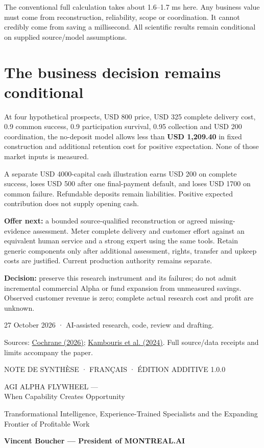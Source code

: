 \documentclass[10pt]{article}
\begin{document}
The conventional full calculation takes about 1.6–1.7 ms here. Any business value must come from reconstruction, reliability, scope or coordination. It cannot credibly come from saving a millisecond. All scientific results remain conditional on supplied source/model assumptions.

\section*{The business decision remains conditional}

At four hypothetical prospects, USD 800 price, USD 325 complete delivery cost, 0.9 common success, 0.9 participation survival, 0.95 collection and USD 200 coordination, the no-deposit model allows less than \textbf{USD 1,209.40} in fixed construction and additional retention cost for positive expectation. None of those market inputs is measured.

A separate USD 4000-capital cash illustration earns USD 200 on complete success, loses USD 500 after one final-payment default, and loses USD 1700 on common failure. Refundable deposits remain liabilities. Positive expected contribution does not supply opening cash.

\textbf{Offer next:} a bounded source-qualified reconstruction or agreed missing-evidence assessment. Meter complete delivery and customer effort against an equivalent human service and a strong expert using the same tools. Retain generic components only after additional assessment, rights, transfer and upkeep costs are justified. Current production authority remains separate.

\textbf{Decision:} preserve this research instrument and its failures; do not admit incremental commercial Alpha or fund expansion from unmeasured savings. Observed customer revenue is zero; complete actual research cost and profit are unknown.

\vfill
{\footnotesize\color{teal}27 October 2026 · AI-assisted research, code, review and drafting.\par
Sources: \href{https://www.cochrane.org/about-us/news/cochrane-strengthens-systems-manage-retracted-publications-its-published-reviews}{Cochrane (2026)}; \href{https://journals.plos.org/plosone/article?id=10.1371/journal.pone.0300333}{Kambouris et al. (2024)}. Full source/data receipts and limits accompany the paper.}

\newpage
\thispagestyle{empty}
{\sffamily\small\color{teal}NOTE DE SYNTHÈSE · FRANÇAIS · ÉDITION ADDITIVE 1.0.0\par}
\vspace{4mm}
{\sffamily\bfseries\color{navy}\fontsize{20}{24}\selectfont\raggedright AGI ALPHA FLYWHEEL —\\When Capability Creates Opportunity\par}
\vspace{3mm}
{\sffamily\fontsize{11}{13}\selectfont Transformational Intelligence, Experience-Trained Specialists and the Expanding Frontier of Profitable Work\par}
\vspace{3mm}
\textbf{Vincent Boucher — President of MONTREAL.AI}
\end{document}
